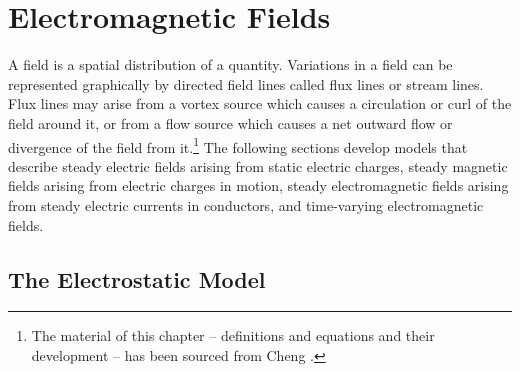 \setlength{\parindent}{0.5cm}
\chapter{Electromagnetic Fields}\label{sec:electromagneticfields}
A field is a spatial distribution of a quantity.  Variations in a field can be represented graphically by directed field lines called flux lines or stream lines.  Flux lines may arise from a vortex source which causes a circulation or curl of the field around it, or from a flow source which causes a net outward flow or divergence of the field from it.\footnote{The material of this chapter -- definitions and equations and their development -- has been sourced from Cheng \cite{Cheng1989}.}  The following sections develop models that describe steady electric fields arising from static electric charges, steady magnetic fields arising from electric charges in motion, steady electromagnetic fields arising from steady electric currents in conductors, and time-varying electromagnetic fields.


\section{The Electrostatic Model}\label{sec:electrostatics}

